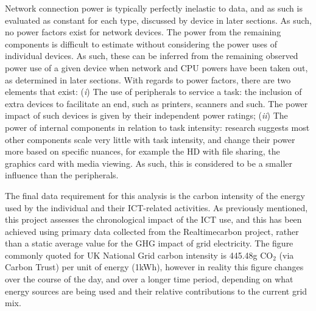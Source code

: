 \documentclass[conference]{IEEEtran}
\begin{document}
Network connection power is typically perfectly inelastic to data, and
as such is evaluated as constant for each type, discussed by device in
later sections. As such, no power factors exist for network
devices. The power from the remaining components is difficult to
estimate without considering the power uses of individual devices. As
such, these can be inferred from the remaining observed power use of a
given device when network and CPU powers have been taken out, as
determined in later sections. With regards to power factors, there are
two elements that exist: ({\emph{i}}) The use of peripherals to
service a task: the inclusion of extra devices to facilitate an end,
such as printers, scanners and such. The power impact of such devices
is given by their independent power ratings; ({\emph{ii}}) The power
of internal components in relation to task intensity: research
suggests most other components scale very little with task intensity,
and change their power more based on specific nuances, for example the
HD with file sharing, the graphics card with media viewing. As such,
this is considered to be a smaller influence than the peripherals.





The final data requirement for this analysis is the carbon intensity
of the energy used by the individual and their ICT-related
activities. As previously mentioned, this project assesses the
chronological impact of the ICT use, and this has been achieved using
primary data collected from the Realtimecarbon project, rather than a
static average value for the GHG impact of grid electricity. The
figure commonly quoted for UK National Grid carbon intensity is
445.48g CO$_2$ (via Carbon Trust) per unit of energy (1kWh), however
in reality this figure changes over the course of the day, and over a
longer time period, depending on what energy sources are being used
and their relative contributions to the current grid mix.
\end{document}
